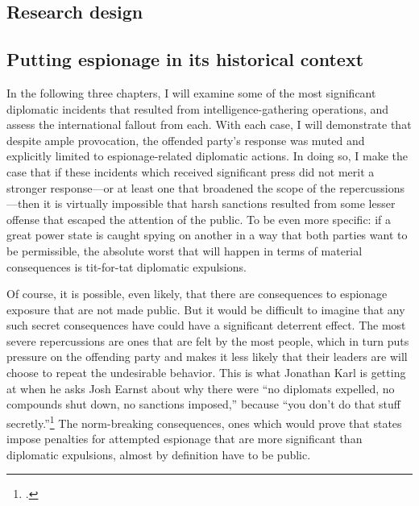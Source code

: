 \documentclass{memoir}
\begin{document}
\begin{refsegment}

\subsection{Research design}
\subsection{Putting espionage in its historical context}
In the following three chapters, I will examine some of the most significant diplomatic incidents that resulted from intelligence-gathering operations, and assess the international fallout from each. With each case, I will demonstrate that despite ample provocation, the offended party's response was muted and explicitly limited to espionage-related diplomatic actions. In doing so, I make the case that if these incidents which received significant press did not merit a stronger response---or at least one that broadened the scope of the repercussions---then it is virtually impossible that harsh sanctions resulted from some lesser offense that escaped the attention of the public. To be even more specific: if a great power state is caught spying on another in a way that both parties want to be permissible, the absolute worst that will happen in terms of material consequences is tit-for-tat diplomatic expulsions.

Of course, it is possible, even likely, that there are consequences to espionage exposure that are not made public. But it would be difficult to imagine that any such secret consequences have could have a significant deterrent effect.  The most severe repercussions are ones that are felt by the most people, which in turn puts pressure on the offending party and makes it less likely that their leaders are will choose to repeat the undesirable behavior. This is what Jonathan Karl is getting at when he asks Josh Earnst about why there were ``no diplomats expelled, no compounds shut down, no sanctions imposed,'' because ``you don't do that stuff secretly.''\footcite{earnest_press_2017} The norm-breaking consequences, ones which would prove that states impose penalties for attempted espionage that are more significant than diplomatic expulsions, almost by definition have to be public.


\end{refsegment}
\end{document}
